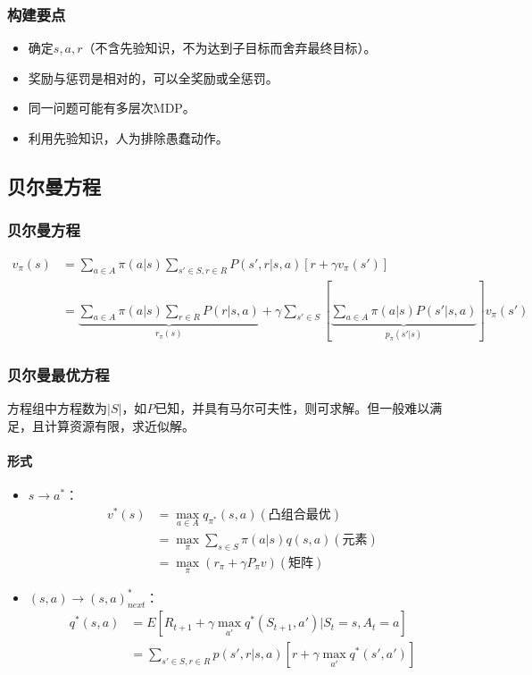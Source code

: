 \documentclass[
12pt, %
a4paper, 
oneside, %
headinclude,footinclude, %
]{scrartcl}
\begin{document}
\subsubsection[构建要点]{构建要点}
\begin{itemize}
\item 确定$ s,a,r $（不含先验知识，不为达到子目标而舍弃最终目标）。
\item 奖励与惩罚是相对的，可以全奖励或全惩罚。
\item 同一问题可能有多层次MDP。
\item 利用先验知识，人为排除愚蠢动作。
\end{itemize}
\subsection[贝尔曼方程]{贝尔曼方程}
\subsubsection[贝尔曼方程]{贝尔曼方程}
\begin{align*}
v_\pi(s) &= \sum_{a \in A} \pi(a|s) \sum_{s' \in S, r \in R} P(s', r|s, a)[r + \gamma v_\pi(s')] \\
&= \underbrace{\sum_{a \in A} \pi(a|s) \sum_{r \in R} P(r|s, a)}_{r_{\pi}(s)} + \gamma \sum_{s' \in S} [\underbrace{\sum_{a \in A} \pi(a|s)P(s'|s, a)}_{p_{\pi}(s'|s)}]v_\pi(s')
\end{align*}
\subsubsection[贝尔曼最优方程]{贝尔曼最优方程}
方程组中方程数为$ |S| $，如$ P $已知，并具有马尔可夫性，则可求解。但一般难以满足，且计算资源有限，求近似解。
\paragraph{形式}
\begin{itemize}
\item $ s \rightarrow a^* $：
\begin{align*}
v^*(s) &= \max_{a \in A} q_{\pi^*}(s, a) (\text{凸组合最优}) \\
&= \max_{\pi} \sum_{s \in S} \pi(a|s)q(s,a) (\text{元素}) \\
&= \max_{\pi} (r_\pi + \gamma P_\pi v) (\text{矩阵})
\end{align*}
\item $ (s, a) \rightarrow (s, a)_{next}^* $：
\begin{align*}
q^*(s, a) &= E[R_{t + 1} + \gamma \max_{a'} q^*(S_{t + 1}, a')|S_t = s, A_t = a] \\
&= \sum_{s' \in S, r \in R} p(s', r|s, a)[r + \gamma \max_{a'} q^*(s', a')]
\end{align*}
\end{itemize}
\end{document}
